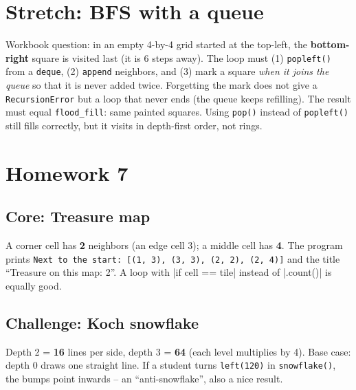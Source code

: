 \section{Stretch: BFS with a queue}
\begin{answer}
Workbook question: in an empty 4-by-4 grid started at the top-left, the \textbf{bottom-right} square is visited last (it is 6 steps away). The loop must (1) \texttt{popleft()} from a \texttt{deque}, (2) \texttt{append} neighbors, and (3) mark a square \emph{when it joins the queue} so that it is never added twice. Forgetting the mark does not give a \texttt{RecursionError} but a loop that never ends (the queue keeps refilling). The result must equal \texttt{flood\_fill}: same painted squares. Using \texttt{pop()} instead of \texttt{popleft()} still fills correctly, but it visits in depth-first order, not rings.
\end{answer}

\section{Homework 7}
\subsection{Core: Treasure map}
\begin{answer}[Core]
A corner cell has \textbf{2} neighbors (an edge cell 3); a middle cell has \textbf{4}. The program prints \texttt{Next to the start: [(1, 3), (3, 3), (2, 2), (2, 4)]} and the title \enquote{Treasure on this map: 2}. A loop with \py|if cell == tile| instead of \py|.count()| is equally good.
\end{answer}

\subsection{Challenge: Koch snowflake}
\begin{answer}[Challenge]
Depth 2 = \textbf{16} lines per side, depth 3 = \textbf{64} (each level multiplies by 4). Base case: depth 0 draws one straight line. If a student turns \texttt{left(120)} in \texttt{snowflake()}, the bumps point inwards -- an \enquote{anti-snowflake}, also a nice result.
\end{answer}

